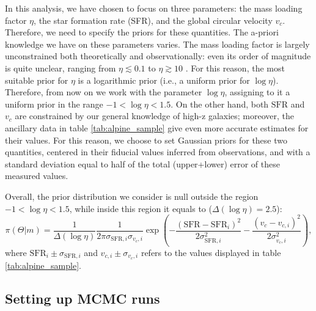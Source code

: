 In this analysis, we have chosen to focus on three parameters: the mass loading factor $\eta$, the star formation rate (SFR), and the global circular velocity $v_c$. Therefore, we need to specify the priors for these quantities.
%
The a-priori knowledge we have on these parameters varies. The mass loading factor is largely unconstrained both theoretically and observationally: even its order of magnitude is quite unclear, ranging from $\eta \lesssim 0.1$ to $\eta \gtrsim 10$ \citep[e.g.,][]{muratov2015}. For this reason, the most suitable prior for $\eta$ is a logarithmic prior (i.e., a uniform prior for $\log \eta$). Therefore, from now on we work with the parameter $\log \eta$, assigning to it a uniform prior in the range $-1 < \log\eta < 1.5$. On the other hand, both $\mathrm{SFR}$ and $v_c$ are constrained by our general knowledge of high-z galaxies; moreover, the ancillary data in table \ref{tab:alpine_sample} give even more accurate estimates for their values. For this reason, we choose to set Gaussian priors for these two quantities, centered in their fiducial values inferred from observations, and with a standard deviation equal to half of the total (upper+lower) error of these measured values.

Overall, the prior distribution we consider is null outside the region $-1 < \log\eta < 1.5$, while inside this region it equals to ($\Delta(\log\eta) = 2.5$):
\begin{equation}
    \pi(\Theta|m) =  \frac{1}{\Delta(\log\eta)}\frac{1}{2\pi\sigma_{\mathrm{SFR},i}\sigma_{v_c,i}}\exp\left(-\frac{\left(\mathrm{SFR}-\mathrm{SFR}_i\right)^2}{2\sigma_{\mathrm{SFR},i}^2}-\frac{\left(v_c-v_{c,i}\right)^2}{2\sigma_{v_c,i}^2}\right),
\end{equation}
where $\mathrm{SFR}_i \pm \sigma_{\mathrm{SFR},i}$ and $v_{c,i} \pm \sigma_{v_c,i}$ refers to the values displayed in table \ref{tab:alpine_sample}.

\subsection{Setting up MCMC runs}

